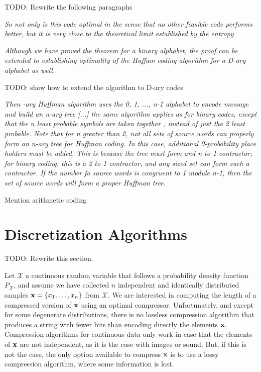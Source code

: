 {\color{red} TODO: Rewrite the following paragraphs}

\emph{So not only is this code optimal in the sense that no other feasible code performs better, but it is very close to the theoretical limit established by the entropy}

\emph{Although we have proved the theorem for a binary alphabet, the proof can be extended to establishing optimality of the Huffam coding algorithm for a D-ary alphabet as well.}

{\color{red} TODO: show how to extend the algorithm to D-ary codes}

\emph{Then -ary Huffman algorithm uses the {0, 1, ..., n-1} alphabet to encode message and build an n-ary tree [...] the same algorithm applies as for binary codes, except that the n least probable symbols are taken together , instead of just the 2 least probable. Note that for n greater than 2, not all sets of source words  can properly form an n-ary tree for Huffman coding. In this case, additional 0-probability place holders must be added. This is because the tree must form and n to 1 contractor; for binary coding, this is a 2 to 1 contractor, and any sized set can form such a contractor. If the number fo source words is congruent to 1 module n-1, then the set of source words will form a proper Huffman tree.}

{\color{red} Mention arithmetic coding}

%
%

\section{Discretization Algorithms}
\label{sec:discretization_algorithms}

{\color{red} TODO: Rewrite this section.}

Let $\mathcal{X}$ a continuous random variable that follows a probability density function $P_\mathcal{X}$, and assume we have collected $n$ independent and identically distributed samples $\bold{x} = \{x_1, \ldots, x_n\}$ from $\mathcal{X}$. We are interested in computing the length of a compressed version of $\bold{x}$ using an optimal compressor. Unfortunately, and except for some degenerate distributions, there is no lossless compression algorithm that produces a string with fewer bits than encoding directly the elements $\bold{x}$. Compression algorithms for continuous data only work in case that the elements of $\bold{x}$ are not independent, as it is the case with images or sound. But, if this is not the case, the only option available to compress $\bold{x}$ is to use a lossy compression algorithm, where some information is lost.

